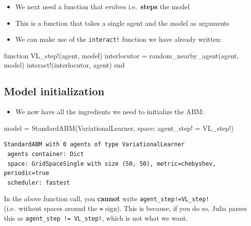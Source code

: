 \documentclass[
  letterpaper,
  DIV=11,
  numbers=noendperiod]{scrartcl}
\newenvironment{Shaded}{\begin{snugshade}}{\end{snugshade}}
\newcommand{\FunctionTok}[1]{\textcolor[rgb]{0.28,0.35,0.67}{#1}}
\newcommand{\KeywordTok}[1]{\textcolor[rgb]{0.00,0.23,0.31}{#1}}
\newcommand{\NormalTok}[1]{\textcolor[rgb]{0.00,0.23,0.31}{#1}}
\newcommand{\OperatorTok}[1]{\textcolor[rgb]{0.37,0.37,0.37}{#1}}
\providecommand{\tightlist}{%
  \setlength{\itemsep}{0pt}\setlength{\parskip}{0pt}}\usepackage{longtable,booktabs,array}
\begin{document}
\begin{itemize}
\tightlist
\item
  We next need a function that evolves i.e.~\textbf{steps} the model
\item
  This is a function that takes a single agent and the model as
  arguments
\item
  We can make use of the \texttt{interact!} function we have already
  written:
\end{itemize}

\begin{Shaded}
\begin{Highlighting}[]
\KeywordTok{function} \FunctionTok{VL\_step!}\NormalTok{(agent, model)}
\NormalTok{  interlocutor }\OperatorTok{=} \FunctionTok{random\_nearby\_agent}\NormalTok{(agent, model)}
  \FunctionTok{interact!}\NormalTok{(interlocutor, agent)}
\KeywordTok{end}
\end{Highlighting}
\end{Shaded}

\subsection{Model initialization}\label{model-initialization}

\begin{itemize}
\tightlist
\item
  We now have all the ingredients we need to initialize the ABM:
\end{itemize}

\begin{Shaded}
\begin{Highlighting}[]
\NormalTok{model }\OperatorTok{=} \FunctionTok{StandardABM}\NormalTok{(VariationalLearner, space; }
\NormalTok{                    agent\_step! }\OperatorTok{=}\NormalTok{ VL\_step!)}
\end{Highlighting}
\end{Shaded}

\begin{verbatim}
StandardABM with 0 agents of type VariationalLearner
 agents container: Dict
 space: GridSpaceSingle with size (50, 50), metric=chebyshev, periodic=true
 scheduler: fastest
\end{verbatim}

In the above function call, you \textbf{cannot} write
\texttt{agent\_step!=VL\_step!} (i.e.~without spaces around the
\texttt{=} sign). This is because, if you do so, Julia parses this as
\texttt{agent\_step\ !=\ VL\_step!}, which is not what we want.
\end{document}

